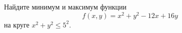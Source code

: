 \documentclass{article}
\begin{document}
Найдите минимум и максимум функции
$$f(x,y) = x^2 + y^2 - 12x + 16y$$
на круге $x^2 + y^2 \leqslant 5^2$.
\end{document}

